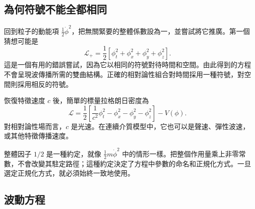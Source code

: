 \subsection{為何符號不能全都相同}

回到粒子的動能項 \(\tfrac12\dot\phi^2\)，把無關緊要的整體係數設為一，並嘗試將它推廣。第一個猜想可能是
\begin{equation}
\mathcal{L}_{+}
=
\frac12
\left[
\phi_t^2+\phi_x^2+\phi_y^2+\phi_z^2
\right].
\label{eq:sr4-all-plus}
\end{equation}
這是一個有用的錯誤嘗試，因為它以相同的符號對待時間和空間。由此得到的方程不會呈現波傳播所需的雙曲結構。正確的相對論性組合對時間採用一種符號，對空間則採用相反的符號。

\begin{classroomqa}
\end{classroomqa}

恢復特徵速度 \(c\) 後，簡單的標量拉格朗日密度為
\begin{equation}
\boxed{
\mathcal{L}
=
\frac12
\left[
\frac{1}{c^2}\phi_t^2
-\phi_x^2-\phi_y^2-\phi_z^2
\right]
-V(\phi)
}.
\label{eq:sr4-scalar-lagrangian}
\end{equation}
對相對論性場而言，\(c\) 是光速。在連續介質模型中，它也可以是聲速、彈性波速，或其他特徵傳播速度。

整體因子 \(1/2\) 是一種約定，就像 \(\tfrac12m\dot\phi^2\) 中的情形一樣。把整個作用量乘上非零常數，不會改變其駐定路徑；這種約定決定了方程中參數的命名和正規化方式。一旦選定正規化方式，就必須始終一致地使用。

\begin{classroomqa}
\end{classroomqa}

\subsection{波動方程}

